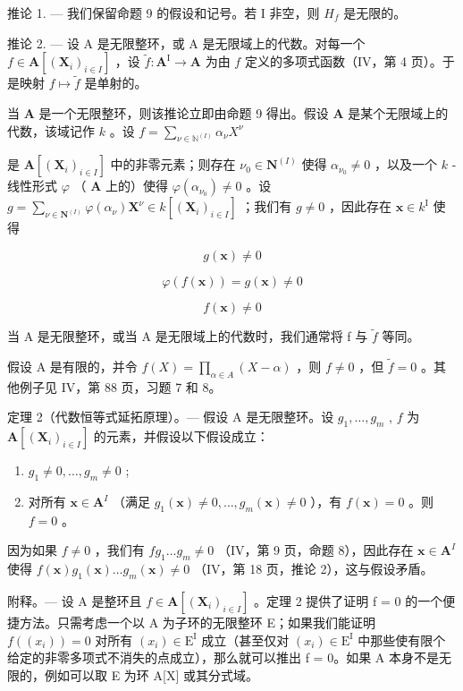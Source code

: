 推论 1. --- 我们保留命题 9 的假设和记号。若 I 非空，则 \(H_{f}\) 是无限的。

推论 2. --- 设 A 是无限整环，或 A 是无限域上的代数。对每一个 \(f \in \mathbf{A}[(\mathbf{X}_i)_{i \in I}]\) ，设 \(\tilde{f}: \mathbf{A}^{\mathrm{I}} \to \mathbf{A}\) 为由 \(f\) 定义的多项式函数（IV，第 4 页）。于是映射 \(f \mapsto \tilde{f}\) 是单射的。

当 \(\mathbf{A}\) 是一个无限整环，则该推论立即由命题 9 得出。假设 \(\mathbf{A}\) 是某个无限域上的代数，该域记作 \(k\) 。设 \(f = \sum_{\nu \in \mathbb{N}^{(I)}} \alpha_{\nu} X^{\nu}\)

是 \(\mathbf{A}[(\mathbf{X}_i)_{i\in I}]\) 中的非零元素；则存在 \(\nu_0\in \mathbf{N}^{(I)}\) 使得 \(\alpha_{\nu_0}\neq 0\) ，以及一个 \(k\) -线性形式 \(\varphi\) （ \(\mathbf{A}\) 上的）使得 \(\varphi (\alpha_{\nu_0})\neq 0\) 。设 \(g = \sum_{\nu \in \mathbf{N}^{(I)}}\varphi (\alpha_{\nu})\mathbf{X}^{\nu}\in k[(\mathbf{X}_i)_{i\in I}]\) ；我们有 \(g\neq 0\) ，因此存在 \(\mathbf{x}\in k^{\mathrm{I}}\) 使得

\[
g (\mathbf {x}) \neq 0
\]

\[
\varphi (f (\mathbf {x})) = g (\mathbf {x}) \neq 0
\]

\[
f (\mathbf {x}) \neq 0
\]

当 A 是无限整环，或当 A 是无限域上的代数时，我们通常将 f 与 \(\tilde{f}\) 等同。

假设 A 是有限的，并令 \(f(X) = \prod_{\alpha \in A} (X - \alpha)\) ，则 \(f \neq 0\) ，但 \(\tilde{f} = 0\) 。其他例子见 IV，第 88 页，习题 7 和 8。

定理 2（代数恒等式延拓原理）。--- 假设 A 是无限整环。设 \(g_1, \ldots, g_m\) , \(f\) 为 \(\mathbf{A}[(\mathbf{X}_i)_{i \in I}]\) 的元素，并假设以下假设成立：

\begin{enumerate}
\def\labelenumi{\alph{enumi})}
\item
  \(g_{1} \neq 0, \ldots, g_{m} \neq 0\) ;
\item
  对所有 \(\mathbf{x} \in \mathbf{A}^{I}\) （满足 \(g_1(\mathbf{x}) \neq 0, \ldots, g_m(\mathbf{x}) \neq 0\) ），有 \(f(\mathbf{x}) = 0\) 。则 \(f = 0\) 。
\end{enumerate}

因为如果 \(f \neq 0\) ，我们有 \(fg_1 \ldots g_m \neq 0\) （IV，第 9 页，命题 8），因此存在 \(\mathbf{x} \in \mathbf{A}^{I}\) 使得 \(f(\mathbf{x})g_1(\mathbf{x}) \ldots g_m(\mathbf{x}) \neq 0\) （IV，第 18 页，推论 2），这与假设矛盾。

附释。--- 设 A 是整环且 \(f \in \mathbf{A}[(\mathbf{X}_i)_{i \in I}]\) 。定理 2 提供了证明 f = 0 的一个便捷方法。只需考虑一个以 A 为子环的无限整环 E；如果我们能证明 \(f((x_i)) = 0\) 对所有 \((x_i) \in \mathrm{E}^{\mathrm{I}}\) 成立（甚至仅对 \((x_i) \in \mathrm{E}^{\mathrm{I}}\) 中那些使有限个给定的非零多项式不消失的点成立），那么就可以推出 f = 0。如果 A 本身不是无限的，例如可以取 E 为环 A{[}X{]} 或其分式域。

